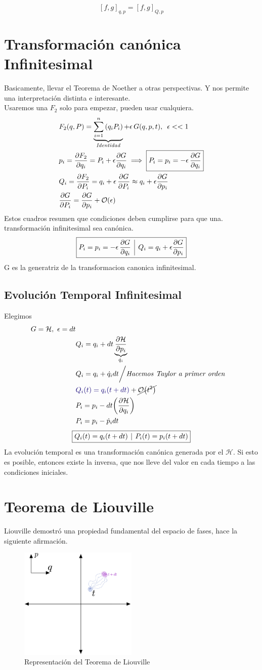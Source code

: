 \documentclass[12pt]{article}
\renewcommand{\H}{\mathcal{H}}
\newcommand{\s}[1]{\section{#1}}
\newcommand{\en}[1]{\[\boxed{#1}\]}
\newcommand{\sumn}[1]{\sum_{#1 =1}^{n}}
\renewcommand{\ss}[1]{\subsection{#1}}
\newcommand{\vl}{\,\,\, \vline \,\,\,}
\newcommand{\rojo}[1]{{\color{rojo}#1}}
\newcommand{\azul}[1]{{\color{azul}#1}}
\begin{document}
\rojo{\en{[f,g]_{q,p}= [f,g]_{Q,p}}}
\s{Transformación canónica Infinitesimal}
Basicamente, llevar el Teorema de Noether a otras perspectivas. Y nos permite una interpretación distinta e interesante.\\
Usaremos una $F_2$ solo para empezar, pueden usar cualquiera.\\
\begin{align}
&F_2(q,P)= \underbrace{\sumn{i} \qty(q_i P_i)}_{\textit{Identidad}} + \epsilon \, G(q,p,t),\,\,\, \epsilon <<1\\	
&p_i = \pdv{F_2}{q_i}= P_i + \epsilon \pdv{G}{q_i}\implies \boxed{P_i=p_i =-\epsilon \, \pdv{G}{q_i}}\\
&Q_i= \pdv{F_2}{P_i}=q_i + \epsilon \, \pdv{G}{P_i}\approx q_i + \epsilon \pdv{G}{p_i}\\
&\pdv{G}{P_i}= \pdv{G}{p_i} + \order{\epsilon}
\end{align}
Estos cuadros resumen que condiciones deben cumplirse para que una. transformación infinitesimal sea canónica.
\rojo{\en{P_i=p_i =-\epsilon \, \pdv{G}{q_i}\vl Q_i= q_i + \epsilon \pdv{G}{p_i}} }
G es la generatriz de la transformacion canonica infinitesimal.
\ss{Evolución Temporal Infinitesimal}
Elegimos 
\begin{align}
G=\H,\,\, \epsilon=dt\\
&Q_i = q_i +dt \underbrace{\pdv{\H}{p_i}}_{\dot{q}_i}\\
&Q_i = q_i + \dot{q}_i dt\bigg/ \textit{Hacemos Taylor a primer orden}\\
&\azul{Q_i(t)= q_i\qty(t+dt)} + \cancel{\order{t^2}}\\
&P_i = p_i - dt \qty(\pdv {\H}{q_i})\\
&P_i = p_i - \dot{p}_i dt
\end{align}
\en{Q_i(t)=q_i \qty(t+dt)\vl P_i(t)= p_i \qty(t+dt)}
La evolución temporal es una transformación canónica generada por el $\H$. Si esto es posible, entonces existe la inversa, que nos lleve del valor en cada tiempo a las condiciones iniciales.\\

\s{Teorema de Liouville}
Liouville demostró una propiedad fundamental del espacio de fases, hace la siguiente afirmación.\\

\begin{figure}[h!]
    \centering
    \includegraphics[width=0.5\textwidth]{lou.png}
    \caption{Representación del Teorema de Liouville}
    \label{lou}
\end{figure}
\end{document}
